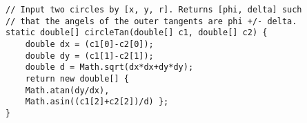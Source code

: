\begin{verbatim}
// Input two circles by [x, y, r]. Returns [phi, delta] such
// that the angels of the outer tangents are phi +/- delta.
static double[] circleTan(double[] c1, double[] c2) {
	double dx = (c1[0]-c2[0]);
	double dy = (c1[1]-c2[1]);
	double d = Math.sqrt(dx*dx+dy*dy);
	return new double[] {
	Math.atan(dy/dx),
	Math.asin((c1[2]+c2[2])/d) };
}
\end{verbatim}
